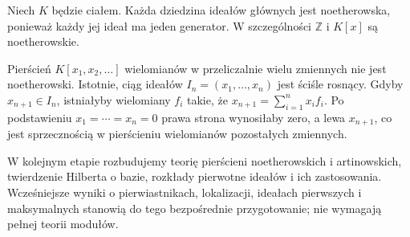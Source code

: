 \begin{przyklad}
\label{aa:prz:noetherian-example}
Niech $K$ będzie ciałem. Każda dziedzina ideałów
głównych jest noetherowska, ponieważ każdy jej ideał
ma jeden generator. W szczególności $\mathbb Z$
i $K[x]$ są noetherowskie.

Pierścień $K[x_1,x_2,\ldots]$ wielomianów w przeliczalnie
wielu zmiennych nie jest noetherowski. Istotnie, ciąg
ideałów $I_n=(x_1,\ldots,x_n)$ jest ściśle rosnący.
Gdyby $x_{n+1}\in I_n$, istniałyby wielomiany $f_i$
takie, że $x_{n+1}=\sum_{i=1}^n x_if_i$.
Po podstawieniu $x_1=\cdots=x_n=0$ prawa strona
wynosiłaby zero, a lewa $x_{n+1}$, co jest sprzecznością
w pierścieniu wielomianów pozostałych zmiennych.
\end{przyklad}

\begin{uwaga}
\label{aa:uw:ring-further}
W kolejnym etapie rozbudujemy teorię pierścieni
noetherowskich i artinowskich, twierdzenie Hilberta
o bazie, rozkłady pierwotne ideałów i ich zastosowania.
Wcześniejsze wyniki o pierwiastnikach, lokalizacji,
ideałach pierwszych i maksymalnych stanowią do tego
bezpośrednie przygotowanie; nie wymagają pełnej
teorii modułów.
\end{uwaga}

\setlength{\parskip}{4pt}
